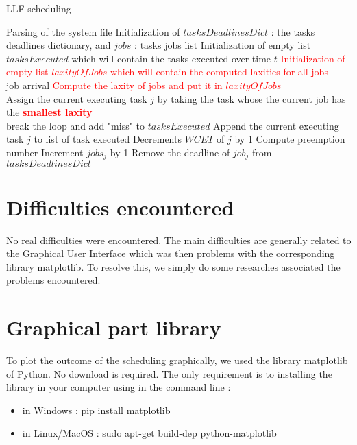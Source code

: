 \documentclass{article}
\begin{document}
\begin{algorithm}[H]
  \caption{LLF scheduling} \label{alg:llf}
  \begin{algorithmic}[1]
  \State Parsing of the system file
  \State Initialization of $tasksDeadlinesDict$ : the tasks deadlines dictionary, and $jobs$ : tasks jobs list 
  \State Initialization of empty list $tasksExecuted$ which will contain the tasks executed over time $t$
  \State \textcolor{red}{Initialization of empty list $laxityOfJobs$ which will contain the computed laxities for all jobs}
  \\
  \State job arrival 
  \EndIf 
  \EndFor
  \State \textcolor{red}{Compute the laxity of jobs and put it in $laxityOfJobs$}
  \\
  \State Assign the current executing task $j$ by taking the task whose the current job 
  \State has the \textcolor{red}{\textbf{smallest laxity}}  
  \\
  \Comment {\textcolor{red}{min(laxityOfJobs) < 0}}
  \State break the loop and add "miss" to $tasksExecuted$
  \Else
  \State Append the current executing task $j$ to list of task executed 
  \State Decrements $WCET$ of $j$ by 1 
  \State Compute preemption number
  \State Increment $jobs_{j}$ by 1 
  \State Remove the deadline of $job_{j}$ from $tasksDeadlinesDict$ 
  \EndIf
  \EndIf
  \EndWhile
  \EndIf
  \EndProcedure
  \end{algorithmic}
\end{algorithm}


\section{Difficulties encountered}
No real difficulties were encountered. The main difficulties are generally related to the Graphical User Interface which was then problems with the corresponding library {\selectfont matplotlib}. To resolve this, we simply do some researches associated the problems encountered.

\section{Graphical part library}
To plot the outcome of the scheduling graphically, we used the library {\selectfont matplotlib} of {\selectfont Python}. No download is required. The only requirement is to installing the library in your computer using in the command line : 
\begin{itemize}
    \item in Windows : {\selectfont pip install matplotlib}
    \item in Linux/MacOS : {\selectfont sudo apt-get build-dep python-matplotlib} 
\end{itemize}
\end{document}
